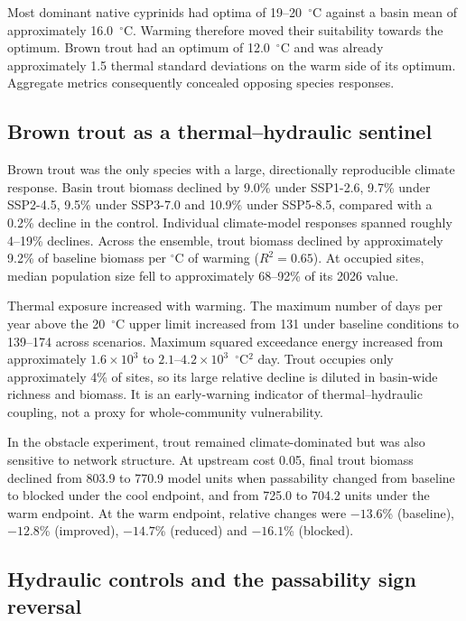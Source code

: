 \documentclass[11pt,a4paper]{article}
\begin{document}
Most dominant native cyprinids had optima of 19--20~$^\circ$C against a basin mean of approximately 16.0~$^\circ$C. Warming therefore moved their suitability towards the optimum. Brown trout had an optimum of 12.0~$^\circ$C and was already approximately 1.5 thermal standard deviations on the warm side of its optimum. Aggregate metrics consequently concealed opposing species responses.

\subsection{Brown trout as a thermal--hydraulic sentinel}

Brown trout was the only species with a large, directionally reproducible climate response. Basin trout biomass declined by 9.0\% under SSP1-2.6, 9.7\% under SSP2-4.5, 9.5\% under SSP3-7.0 and 10.9\% under SSP5-8.5, compared with a 0.2\% decline in the control. Individual climate-model responses spanned roughly 4--19\% declines. Across the ensemble, trout biomass declined by approximately 9.2\% of baseline biomass per $^\circ$C of warming ($R^2=0.65$). At occupied sites, median population size fell to approximately 68--92\% of its 2026 value.

Thermal exposure increased with warming. The maximum number of days per year above the 20~$^\circ$C upper limit increased from 131 under baseline conditions to 139--174 across scenarios. Maximum squared exceedance energy increased from approximately $1.6\times10^3$ to $2.1$--$4.2\times10^3$~$^\circ$C$^2$ day. Trout occupies only approximately 4\% of sites, so its large relative decline is diluted in basin-wide richness and biomass. It is an early-warning indicator of thermal--hydraulic coupling, not a proxy for whole-community vulnerability.

In the obstacle experiment, trout remained climate-dominated but was also sensitive to network structure. At upstream cost 0.05, final trout biomass declined from 803.9 to 770.9 model units when passability changed from baseline to blocked under the cool endpoint, and from 725.0 to 704.2 units under the warm endpoint. At the warm endpoint, relative changes were $-13.6$\% (baseline), $-12.8$\% (improved), $-14.7$\% (reduced) and $-16.1$\% (blocked).

\subsection{Hydraulic controls and the passability sign reversal}
\end{document}

